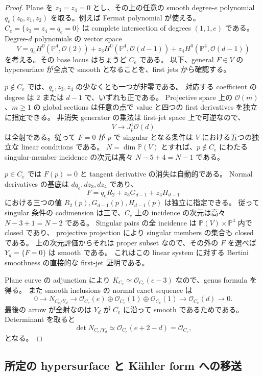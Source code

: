 \begin{proof}
Plane を $z_3=z_4=0$ とし、その上の任意の smooth degree-$e$ polynomial
$q_e(z_0,z_1,z_2)$ を取る。例えば Fermat polynomial が使える。
$C_e=\{z_3=z_4=q_e=0\}$ は complete intersection of degrees $(1,1,e)$ である。
Degree-$d$ polynomials の vector space
\[
 V=q_e H^0(\mathbb P^4,\mathcal O(2))
   +z_3 H^0(\mathbb P^4,\mathcal O(d-1))
   +z_4 H^0(\mathbb P^4,\mathcal O(d-1))
\]
を考える。その base locus はちょうど $C_e$ である。
以下、general $F\in V$ の hypersurface が全点で smooth となることを、first jets から確認する。

$p\notin C_e$ では、$q_e,z_3,z_4$ の少なくとも一つが非零である。
対応する coefficient の degree は $2$ または $d-1$ で、いずれも正である。
Projective space 上の $\mathcal O(m)$、$m\ge1$ の global sections は任意の点で
value と四つの first derivatives を独立に指定できる。
非消失 generator の乗法は first-jet space 上で可逆なので、
\[
 V\longrightarrow J_p^1\mathcal O(d)
\]
は全射である。従って $F=0$ が $p$ で singular となる条件は $V$ における五つの独立な linear conditions である。
$N=\dim\mathbb P(V)$ とすれば、$p\notin C_e$ にわたる singular-member incidence の次元は高々
$N-5+4=N-1$ である。

$p\in C_e$ では $F(p)=0$ と tangent derivative の消失は自動的である。
Normal derivatives の基底は $dq_e,dz_3,dz_4$ であり、
\[
 F=q_eR_2+z_3G_{d-1}+z_4H_{d-1}
\]
における三つの値 $R_2(p),G_{d-1}(p),H_{d-1}(p)$ は独立に指定できる。
従って singular 条件の codimension は三で、$C_e$ 上の incidence の次元は高々
$N-3+1=N-2$ である。
Singular pairs の全 incidence は $\mathbb P(V)\times\mathbb P^4$ 内で closed であり、
projective projection により singular members の集合も closed である。
上の次元評価からそれは proper subset なので、その外の $F$ を選べば $Y_d=\{F=0\}$ は smooth である。
これはこの linear system に対する Bertini smoothness の直接的な first-jet 証明である。

Plane curve の adjunction により $K_{C_e}\simeq\mathcal O_{C_e}(e-3)$ なので、genus formula を得る。
また smooth inclusions の normal exact sequence は
\[
 0\longrightarrow N_{C_e/Y_d}
 \longrightarrow
 \mathcal O_{C_e}(e)\oplus\mathcal O_{C_e}(1)\oplus\mathcal O_{C_e}(1)
 \longrightarrow\mathcal O_{C_e}(d)\longrightarrow0.
\]
最後の arrow が全射なのは $Y_d$ が $C_e$ に沿って smooth であるためである。
Determinant を取ると
\[
 \det N_{C_e/Y_d}
 \simeq\mathcal O_{C_e}(e+2-d)
 =\mathcal O_{C_e},
\]
となる。
\end{proof}

\subsection{所定の hypersurface と K\"ahler form への移送}

